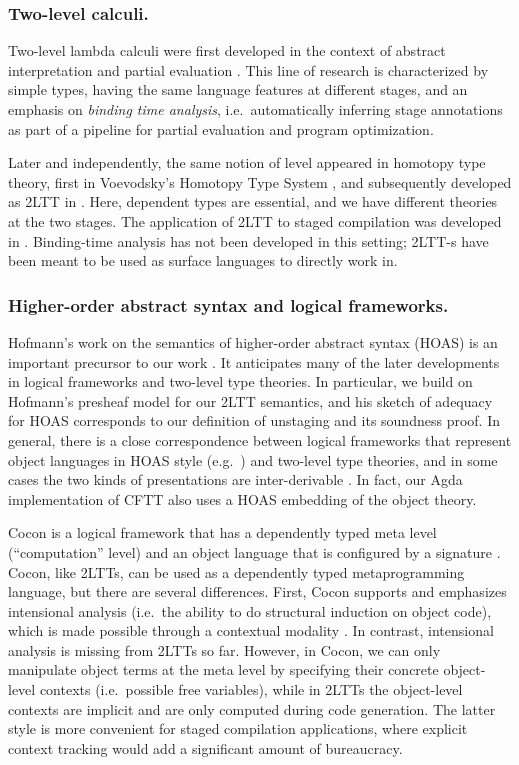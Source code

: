 \documentclass[acmsmall,screen]{acmart}
\theoremstyle{remark}
\begin{document}
\subsubsection*{Two-level calculi.}
Two-level lambda calculi were first developed in the context of abstract
interpretation and partial evaluation
\cite{DBLP:phd/ethos/Nielson84a,DBLP:books/daglib/0071307}.  This line of
research is characterized by simple types, having the same language features at
different stages, and an emphasis on \emph{binding time analysis},
i.e.\ automatically inferring stage annotations as part of a pipeline for
partial evaluation and program optimization.

Later and independently, the same notion of level appeared in homotopy type
theory, first in Voevodsky's Homotopy Type System \cite{hts}, and subsequently
developed as 2LTT in \cite{twolevel}. Here, dependent types are essential, and
we have different theories at the two stages. The application of 2LTT to staged
compilation was developed in \cite{staged2ltt}. Binding-time analysis has not
been developed in this setting; 2LTT-s have been meant to be used as surface
languages to directly work in.

\subsubsection*{Higher-order abstract syntax and logical frameworks.}
Hofmann's work on the semantics of higher-order abstract syntax (HOAS) is an
important precursor to our work \cite{Hofmann:1999:SAH:788021.788940}. It
anticipates many of the later developments in logical frameworks and two-level
type theories. In particular, we build on Hofmann's presheaf model for our 2LTT
semantics, and his sketch of adequacy for HOAS corresponds to our definition of
unstaging and its soundness proof. In general, there is a close correspondence
between logical frameworks that represent object languages in HOAS style
(e.g.\ \cite{Harper93lf}) and two-level type theories, and in some cases the two
kinds of presentations are inter-derivable \cite[Section
  3.3]{DBLP:journals/corr/abs-2302-08837}. In fact, our Agda implementation
of CFTT also uses a HOAS embedding of the object theory.

Cocon is a logical framework that has a dependently typed meta level
(``computation'' level) and an object language that is configured by a signature
\cite{DBLP:journals/corr/abs-1901-03378}. Cocon, like 2LTTs, can be used as a
dependently typed metaprogramming language, but there are several
differences. First, Cocon supports and emphasizes intensional analysis
(i.e.\ the ability to do structural induction on object code), which is made
possible through a contextual modality \cite{nanevski2008contextual}. In
contrast, intensional analysis is missing from 2LTTs so far. However, in Cocon,
we can only manipulate object terms at the meta level by specifying their
concrete object-level contexts (i.e.\ possible free variables), while in 2LTTs
the object-level contexts are implicit and are only computed during code
generation. The latter style is more convenient for staged compilation
applications, where explicit context tracking would add a significant amount of
bureaucracy.
\end{document}
